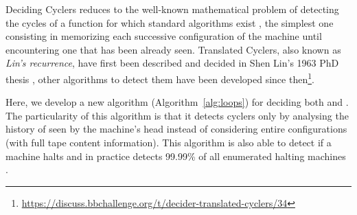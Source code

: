 Deciding Cyclers reduces to the well-known mathematical problem of detecting the cycles of a function for which standard algorithms exist \cite{wiki:Cycle_detection}, the simplest one consisting in memorizing each successive configuration of the machine until encountering one that has been already seen. Translated Cyclers, also known as \textit{Lin's recurrence}, have first been described and decided in Shen Lin's 1963 PhD thesis \cite{Lin1963}, other algorithms to detect them have been developed since then\footnote{\url{https://discuss.bbchallenge.org/t/decider-translated-cyclers/34}}.

Here, we develop a new algorithm (Algorithm~\ref{alg:loops}) for deciding both \cyclers and \TCs. The particularity of this algorithm is that it detects cyclers only by analysing the history of \ssps seen by the machine's head instead of considering entire configurations (\ie with full tape content information). This algorithm is also able to detect if a machine halts and in practice detects 99.99\% of all enumerated halting machines .

